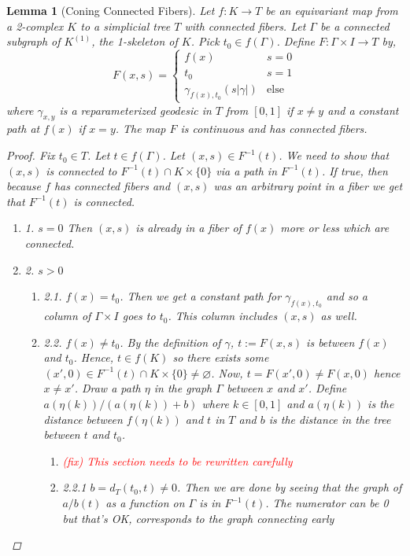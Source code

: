 \documentclass{article}
\newcommand{\fix}[1]{\textcolor{red}{(fix) #1}}
\theoremstyle{mystyle}
\newtheorem{lem}[thm]{Lemma}
\theoremstyle{remark}
\begin{document}
\begin{lem}
    [Coning Connected Fibers]
    \label{lem:confib} 
     Let $f:K\to T$ be an equivariant map from a 2-complex $K$ to a simplicial tree $T$ with connected fibers. Let $\Gamma$ be a connected subgraph of $K^{(1)}$, the 1-skeleton of $K$. Pick $t_0\in f(\Gamma)$. Define $F:\Gamma\times I\to T$ by,
    \[ F(x,s) = 
        \begin{cases} 
            f(x)& s=0\\ 
            t_{0} & s=1\\
            \gamma_{f(x),t_{0}} (s | \gamma |) & \text{else}
        \end{cases}
    \]
    where $\gamma_{x,y}$ is a reparameterized geodesic in $T$ from $[0,1]$ if $x\neq y$ and a constant path at $f(x)$ if $x=y$. The map $F$ is continuous and has connected fibers.
    \begin{proof}
            Fix $t_0\in T$. Let $t\in f(\Gamma)$. Let $(x,s)\in F^{-1}(t)$. We need to show that $(x,s)$ is connected to $F^{-1}(t)\cap K\times\{0\}$ via a path in $F^{-1}(t)$. If true, then because $f$ has connected fibers and $(x,s)$ was an arbitrary point in a fiber we get that $F^{-1}(t)$ is connected.
            \begin{enumerate}
                \item 1. $s = 0$ Then $(x,s)$ is already in a fiber of $f(x)$ more or less which are connected.
                \item 2. $s > 0$
                \begin{enumerate}
                    \item 2.1. $f(x)=t_0$. Then we get a constant path for $\gamma_{f(x),t_0}$ and so a column of $\Gamma\times I$ goes to $t_0$. This column includes $(x,s)$ as well.
                    \item 2.2. $f(x)\neq t_0$. By the definition of $\gamma$, $t:=F(x,s)$ is between $f(x)$ and $t_0$. Hence, $t\in f(K)$ so there exists some  $(x',0)\in F^{-1}(t)\cap K\times\{0\}\neq\varnothing$. Now, $t=F(x',0)\neq F(x,0)$ hence $x\neq x'$. Draw a path $\eta$ in the graph $\Gamma$ between $x$ and $x'$. Define $a(\eta (k))/(a(\eta (k))+b)$ where $k\in [0,1]$ and $a(\eta(k))$ is the distance between $f(\eta (k))$ and $t$ in $T$ and $b$ is the distance in the tree between $t$ and $t_0$.
                    \begin{enumerate}
                        \item \fix{This section needs to be rewritten carefully}
                        \item 2.2.1 $b=d_T(t_0,t)\neq 0$. Then we are done by seeing that the graph of $a/b(t)$ as a function on $\Gamma$ is in $F^{-1}(t)$. The numerator can be 0 but that's OK, corresponds to the graph connecting early

\end{enumerate}
\end{enumerate}
\end{enumerate}
\end{proof}
\end{lem}
\end{document}
